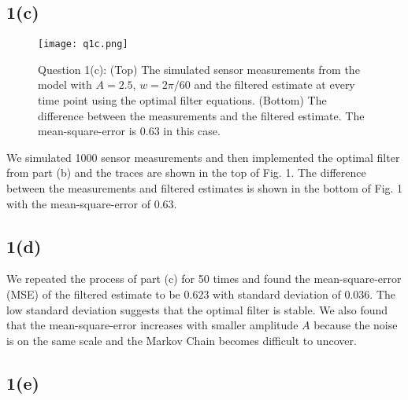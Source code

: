 \documentclass[a4paper, 11pt]{article}
\begin{document}
\subsection*{1(c)}

\begin{figure}
	\begin{center}
		\texttt{[image: q1c.png]}
		\caption{Question 1(c): (Top) The simulated sensor measurements from the model with $A = 2.5$, $w = 2\pi/60$ and the filtered estimate at every time point using the optimal filter equations. (Bottom) The difference between the measurements and the filtered estimate. The mean-square-error is $0.63$ in this case. }
	\end{center}
	\label{fig:q1c}
\end{figure}

We simulated 1000 sensor measurements and then implemented the optimal filter from part (b) and the traces are shown in the top of Fig. 1. The difference between the measurements and filtered estimates is shown in the bottom of Fig. 1 with the mean-square-error of $0.63$.  



\subsection*{1(d)}

We repeated the process of part (c) for 50 times and found the mean-square-error (MSE) of the filtered estimate to be $0.623$ with standard deviation of $0.036$. The low standard deviation suggests that the optimal filter is stable. We also found that the mean-square-error increases with smaller amplitude $A$ because the noise is on the same scale and the Markov Chain becomes difficult to uncover.  



\subsection*{1(e)}
\end{document}
